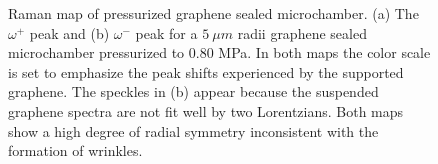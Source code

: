 \begin{figure}
	\begin{center}
	
	\end{center}
	\caption[Raman map of pressurized graphene sealed microchamber]{\label{fig:fri:cylindrical} Raman map of pressurized graphene sealed microchamber. (a) The $\omega^+$ peak and (b) $\omega^-$ peak for a $5 \ \mu m$ radii graphene sealed microchamber pressurized to 0.80 MPa.  In both maps the color scale is set to emphasize the peak shifts experienced by the supported graphene.  The speckles in (b) appear because the suspended graphene spectra are not fit well by two Lorentzians.  Both maps show a high degree of radial symmetry inconsistent with the formation of wrinkles.}
\end{figure}

